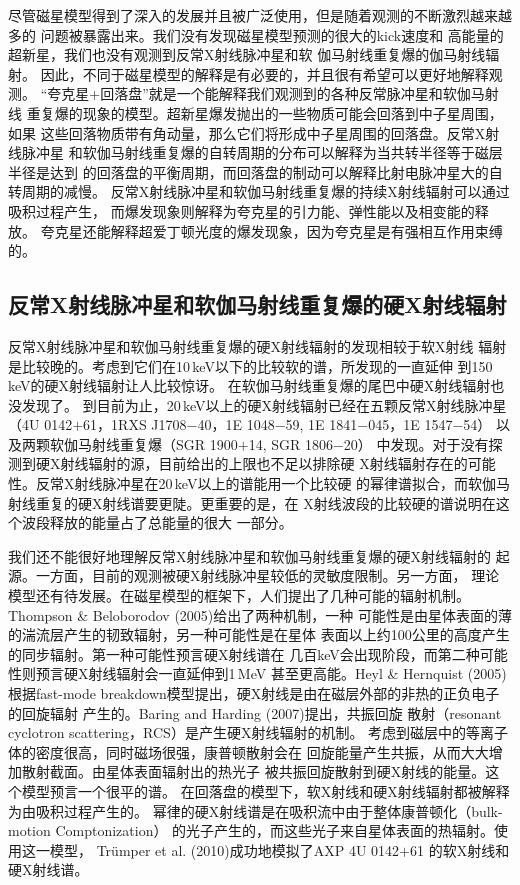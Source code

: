 尽管磁星模型得到了深入的发展并且被广泛使用，但是随着观测的不断激烈越来越多的
问题被暴露出来。我们没有发现磁星模型预测的很大的kick速度\supercite{hcb+07}和
高能量的超新星\supercite{gsg+01,vk06}，我们也没有观测到反常X射线脉冲星和软
伽马射线重复爆的伽马射线辐射\supercite{tsx11}。
%
因此，不同于磁星模型的解释是有必要的，并且很有希望可以更好地解释观测。
“夸克星+回落盘”就是一个能解释我们观测到的各种反常脉冲星和软伽马射线
重复爆的现象的模型。超新星爆发抛出的一些物质可能会回落到中子星周围，如果
这些回落物质带有角动量，那么它们将形成中子星周围的回落盘。反常X射线脉冲星
和软伽马射线重复爆的自转周期的分布可以解释为当共转半径等于磁层半径是达到
的回落盘的平衡周期，而回落盘的制动可以解释比射电脉冲星大的自转周期的减慢\supercite{a01,chn00}。
反常X射线脉冲星和软伽马射线重复爆的持续X射线辐射可以通过吸积过程产生，
而爆发现象则解释为夸克星的引力能、弹性能以及相变能的释放\supercite{tx11}。
夸克星还能解释超爱丁顿光度的爆发现象，因为夸克星是有强相互作用束缚的。

\subsection{反常X射线脉冲星和软伽马射线重复爆的硬X射线辐射}

反常X射线脉冲星和软伽马射线重复爆的硬X射线辐射的发现相较于软X射线
辐射是比较晚的。考虑到它们在10\,keV以下的比较软的谱，所发现的一直延伸
到150\,keV的硬X射线辐射让人比较惊讶\supercite{khm04,mcl+04,dhk+06}。
在软伽马射线重复爆的尾巴中硬X射线辐射也没发现了\supercite{mgm+05,gmt+06}。
到目前为止，20\,keV以上的硬X射线辐射已经在五颗反常X射线脉冲星
（4U 0142$+$61，1RXS J1708$-$40，1E 1048$-$59, 1E 1841$-$045，1E 1547$-$54）\supercite{dhk+06,khd+06,lwr08,khm04,enm+10}
以及两颗软伽马射线重复爆（SGR 1900$+$14, SGR 1806$-$20）\supercite{gmt+06,emt+07}
中发现。对于没有探测到硬X射线辐射的源，目前给出的上限也不足以排除硬
X射线辐射存在的可能性。反常X射线脉冲星在20\,keV以上的谱能用一个比较硬
的幂律谱拟合，而软伽马射线重复的硬X射线谱要更陡。更重要的是，在
X射线波段的比较硬的谱说明在这个波段释放的能量占了总能量的很大
一部分\supercite{m08}。

我们还不能很好地理解反常X射线脉冲星和软伽马射线重复爆的硬X射线辐射的
起源。一方面，目前的观测被硬X射线脉冲星较低的灵敏度限制。另一方面，
理论模型还有待发展。在磁星模型的框架下，人们提出了几种可能的辐射机制。
Thompson \& Beloborodov (2005)\supercite{tb05}给出了两种机制，一种
可能性是由星体表面的薄的湍流层产生的韧致辐射，另一种可能性是在星体
表面以上约100公里的高度产生的同步辐射。第一种可能性预言硬X射线谱在
几百keV会出现阶段，而第二种可能性则预言硬X射线辐射会一直延伸到1\,MeV
甚至更高能。Heyl \& Hernquist (2005)\supercite{hh05}根据fast-mode 
breakdown模型提出，硬X射线是由在磁层外部的非热的正负电子的回旋辐射
产生的。Baring and Harding (2007)\supercite{bh07}提出，共振回旋
散射（resonant cyclotron scattering，RCS）是产生硬X射线辐射的机制。
考虑到磁层中的等离子体的密度很高，同时磁场很强，康普顿散射会在
回旋能量产生共振，从而大大增加散射截面。由星体表面辐射出的热光子
被共振回旋散射到硬X射线的能量。这个模型预言一个很平的谱。
在回落盘的模型下，软X射线和硬X射线辐射都被解释为由吸积过程产生的。
幂律的硬X射线谱是在吸积流中由于整体康普顿化（bulk-motion Comptonization）
的光子产生的，而这些光子来自星体表面的热辐射。使用这一模型，
Tr\"{u}mper et al. (2010)\supercite{tze+10}成功地模拟了AXP 4U 0142$+$61
的软X射线和硬X射线谱。


